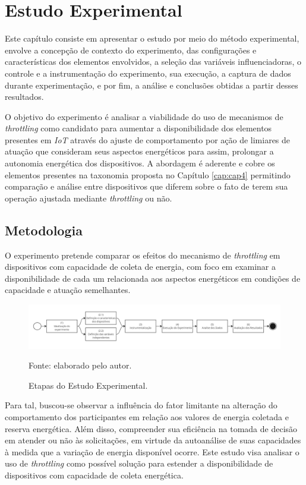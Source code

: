 \chapter{Estudo Experimental}
\label{cap:cap6}

Este capítulo consiste em apresentar o estudo por meio do método experimental, envolve a concepção de contexto do experimento, das configurações e características dos elementos envolvidos, a seleção das variáveis influenciadoras, o controle e a instrumentação do experimento, sua execução, a captura de dados durante experimentação, e por fim, a análise e conclusões obtidas a partir desses resultados. 

O objetivo do experimento é analisar a viabilidade do uso de mecanismos de \textit{throttling} como candidato para aumentar a disponibilidade dos elementos presentes em \textit{IoT} através do ajuste de comportamento por ação de limiares de atuação que consideram seus aspectos energéticos para assim,  prolongar a autonomia energética dos dispositivos. A abordagem é aderente e cobre os elementos presentes na taxonomia proposta no Capítulo \ref{cap:cap4} permitindo comparação e análise entre dispositivos que diferem sobre o fato de terem sua operação ajustada mediante \textit{throttling} ou não. 

\section{Metodologia}

O experimento pretende comparar os efeitos do mecanismo de \textit{throttling} em dispositivos com capacidade de coleta de energia, com foco em examinar a disponibilidade de cada um relacionada aos aspectos energéticos em condições de capacidade e atuação semelhantes.

\begin{figure}[H]
	\centering
	\caption{Etapas do Estudo Experimental.}
	\label{fig:cap6metodologia}
	\includegraphics[width=1\linewidth]{Imagens/cap6/cap6metodologia.jpg}
	
	Fonte: elaborado pelo autor.
\end{figure} 

Para tal, buscou-se observar a influência do fator limitante na alteração do comportamento dos participantes em relação aos valores de energia coletada e reserva energética. Além disso, compreender sua eficiência na tomada de decisão em atender ou não às solicitações, em virtude da autoanálise de suas capacidades à medida que a variação de energia disponível ocorre. Este estudo visa analisar o uso de \textit{throttling} como possível solução para estender a disponibilidade de dispositivos com capacidade de coleta energética. 

